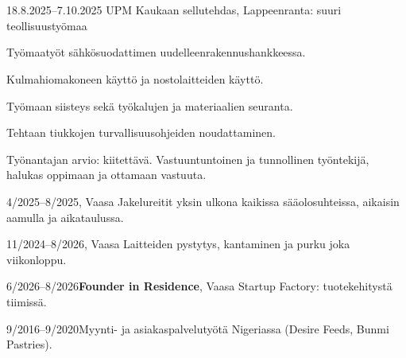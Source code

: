 \documentclass[a4paper,11pt]{article}
\begin{document}
\section{}
\begin{cventry}{18.8.2025--7.10.2025}{}
  UPM Kaukaan sellutehdas, Lappeenranta: suuri teollisuustyömaa\par
  Työmaatyöt sähkösuodattimen uudelleenrakennushankkeessa.\par
  Kulmahiomakoneen käyttö ja nostolaitteiden käyttö.\par
  Työmaan siisteys sekä työkalujen ja materiaalien seuranta.\par
  Tehtaan tiukkojen turvallisuusohjeiden noudattaminen.\par
  Työnantajan arvio: kiitettävä. Vastuuntuntoinen ja tunnollinen työntekijä, halukas oppimaan ja ottamaan vastuuta.
\end{cventry}
\begin{cventry}{4/2025--8/2025}{, Vaasa}
  Jakelureitit yksin ulkona kaikissa sääolosuhteissa, aikaisin aamulla ja aikataulussa.
\end{cventry}
\begin{cventry}{11/2024--8/2026}{, Vaasa}
  Laitteiden pystytys, kantaminen ja purku joka viikonloppu.
\end{cventry}
\begin{cventry}{6/2026--8/2026}{\textbf{Founder in Residence}, Vaasa Startup Factory: tuotekehitystä tiimissä.}
\end{cventry}
\begin{cventry}{9/2016--9/2020}{Myynti- ja asiakaspalvelutyötä Nigeriassa (Desire Feeds, Bunmi Pastries).}
\end{cventry}

\section{}

\section{}
\end{document}
